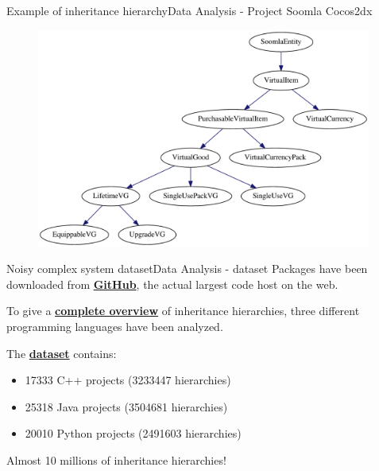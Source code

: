 \documentclass[11pt,svgnames]{beamer}
\begin{document}
\begin{frame}{Example of inheritance hierarchy}{Data Analysis - Project Soomla Cocos2dx}
\begin{figure}[H]%
\includegraphics[width=11cm,draft=false]{immagini/soomla1.pdf}
\end{figure}
\end{frame}

\begin{frame}{Noisy complex system dataset}{Data Analysis - dataset}
Packages have been downloaded from \textbf{\underline{GitHub}}, the actual largest code host on the web.

\vspace{0.5cm}
To give a \textbf{\underline{complete overview}} of inheritance hierarchies, three different programming languages have been analyzed.

\vspace{0.5cm}
The \textbf{\underline{dataset}} contains:
\begin{itemize}
\item 17333 C++ projects (3233447 hierarchies)
\item 25318 Java projects (3504681 hierarchies)
\item 20010 Python projects (2491603 hierarchies)
\end{itemize}
\vspace{0.2cm}
\begin{tcolorbox}[colframe=green]
\center
Almost 10 millions of inheritance hierarchies!
\end{tcolorbox}
\end{frame}
\end{document}

